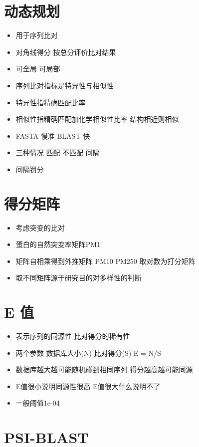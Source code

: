 \documentclass[]{book}
\providecommand{\tightlist}{%
  \setlength{\itemsep}{0pt}\setlength{\parskip}{0pt}}
\begin{document}
\section{动态规划}

\begin{itemize}
\tightlist
\item
  用于序列比对
\item
  对角线得分 按总分评价比对结果
\item
  可全局 可局部
\item
  序列比对指标是特异性与相似性
\item
  特异性指精确匹配比率
\item
  相似性指精确匹配加化学相似性比率 结构相近则相似
\item
  FASTA 慢准 BLAST 快
\item
  三种情况 匹配 不匹配 间隔
\item
  间隔罚分
\end{itemize}

\section{得分矩阵}

\begin{itemize}
\tightlist
\item
  考虑突变的比对
\item
  蛋白的自然突变率矩阵PM1
\item
  矩阵自相乘得到外推矩阵 PM10 PM250 取对数为打分矩阵
\item
  取不同矩阵源于研究目的对多样性的判断
\end{itemize}

\hypertarget{e-}{%
\section{E 值}\label{e-}}

\begin{itemize}
\tightlist
\item
  表示序列的同源性 比对得分的稀有性
\item
  两个参数 数据库大小(N) 比对得分(S) E = N/S
\item
  数据库越大越可能随机碰到相同序列 得分越高越可能同源
\item
  E值很小说明同源性很高 E值很大什么说明不了
\item
  一般阈值1e-04
\end{itemize}

\hypertarget{psi-blast}{%
\section{PSI-BLAST}\label{psi-blast}}
\end{document}
